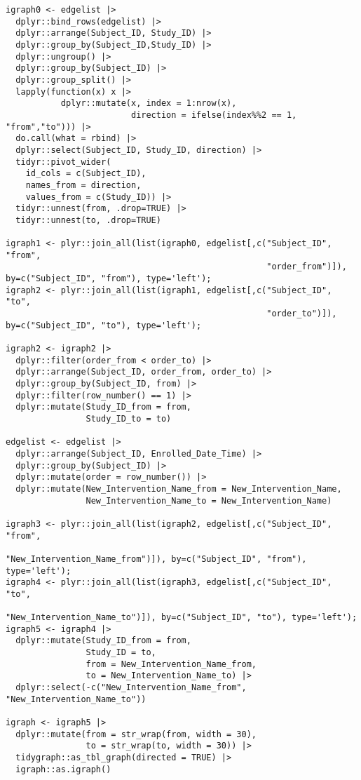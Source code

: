 \begin{verbatim}
igraph0 <- edgelist |>
  dplyr::bind_rows(edgelist) |>
  dplyr::arrange(Subject_ID, Study_ID) |>
  dplyr::group_by(Subject_ID,Study_ID) |>
  dplyr::ungroup() |>
  dplyr::group_by(Subject_ID) |>
  dplyr::group_split() |>
  lapply(function(x) x |>
           dplyr::mutate(x, index = 1:nrow(x),
                         direction = ifelse(index%%2 == 1, "from","to"))) |>
  do.call(what = rbind) |>
  dplyr::select(Subject_ID, Study_ID, direction) |>
  tidyr::pivot_wider(
    id_cols = c(Subject_ID),
    names_from = direction,
    values_from = c(Study_ID)) |>
  tidyr::unnest(from, .drop=TRUE) |>
  tidyr::unnest(to, .drop=TRUE) 

igraph1 <- plyr::join_all(list(igraph0, edgelist[,c("Subject_ID", "from",
                                                    "order_from")]), by=c("Subject_ID", "from"), type='left');
igraph2 <- plyr::join_all(list(igraph1, edgelist[,c("Subject_ID", "to",
                                                    "order_to")]), by=c("Subject_ID", "to"), type='left');

igraph2 <- igraph2 |>
  dplyr::filter(order_from < order_to) |>
  dplyr::arrange(Subject_ID, order_from, order_to) |>
  dplyr::group_by(Subject_ID, from) |>
  dplyr::filter(row_number() == 1) |>
  dplyr::mutate(Study_ID_from = from,
                Study_ID_to = to) 

edgelist <- edgelist |>
  dplyr::arrange(Subject_ID, Enrolled_Date_Time) |>
  dplyr::group_by(Subject_ID) |>
  dplyr::mutate(order = row_number()) |>
  dplyr::mutate(New_Intervention_Name_from = New_Intervention_Name, 
                New_Intervention_Name_to = New_Intervention_Name)

igraph3 <- plyr::join_all(list(igraph2, edgelist[,c("Subject_ID", "from", 
                                                    "New_Intervention_Name_from")]), by=c("Subject_ID", "from"), type='left');
igraph4 <- plyr::join_all(list(igraph3, edgelist[,c("Subject_ID", "to", 
                                                    "New_Intervention_Name_to")]), by=c("Subject_ID", "to"), type='left');
igraph5 <- igraph4 |>
  dplyr::mutate(Study_ID_from = from,
                Study_ID = to,
                from = New_Intervention_Name_from,
                to = New_Intervention_Name_to) |>
  dplyr::select(-c("New_Intervention_Name_from", "New_Intervention_Name_to"))

igraph <- igraph5 |>
  dplyr::mutate(from = str_wrap(from, width = 30),
                to = str_wrap(to, width = 30)) |>
  tidygraph::as_tbl_graph(directed = TRUE) |>
  igraph::as.igraph()


\end{verbatim}
